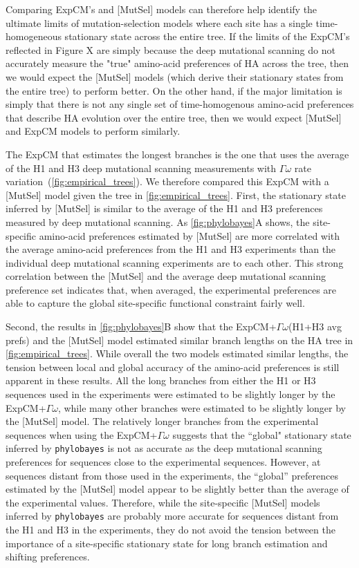 \documentclass[11pt]{article}
\newcommand\modelName[1]{{\color{magenta}[#1]}}
\begin{document}
Comparing ExpCM's and \modelName{MutSel} models can therefore help identify the ultimate limits of mutation-selection models where each site has a single time-homogeneous stationary state across the entire tree. 
If the limits of the ExpCM's reflected in Figure X are simply because the deep mutational scanning do not accurately measure the "true" amino-acid preferences of HA across the tree, then we would expect the \modelName{MutSel} models (which derive their stationary states from the entire tree) to perform better.
On the other hand, if the major limitation is simply that there is not any single set of time-homogenous amino-acid preferences that describe HA evolution over the entire tree, then we would expect \modelName{MutSel} and ExpCM models to perform similarly.

The ExpCM that estimates the longest branches is the one that uses the average of the H1 and H3 deep mutational scanning measurements with $\Gamma\omega$ rate variation~(\ref{fig:empirical_trees}).  
We therefore compared this ExpCM with a \modelName{MutSel} model given the tree in \ref{fig:empirical_trees}. 
First, the stationary state inferred by \modelName{MutSel} is similar to the average of the H1 and H3 preferences measured by deep mutational scanning. 
As \ref{fig:phylobayes}A shows, the site-specific amino-acid preferences estimated by \modelName{MutSel} are more correlated with the average amino-acid preferences from the H1 and H3 experiments than the individual deep mutational scanning experiments are to each other. 
This strong correlation between the \modelName{MutSel} and the average deep mutational scanning preference set indicates that, when averaged, the experimental preferences are able to capture the global site-specific functional constraint fairly well. 

Second, the results in \ref{fig:phylobayes}B show that the ExpCM+$\Gamma\omega$(H1+H3 avg prefs) and the \modelName{MutSel} model estimated similar branch lengths on the HA tree in \ref{fig:empirical_trees}. 
While overall the two models estimated similar lengths, the tension between local and global accuracy of the amino-acid preferences is still apparent in these results. 
All the long branches from either the H1 or H3 sequences used in the experiments were estimated to be slightly longer by the ExpCM+$\Gamma\omega$, while many other branches were estimated to be slightly longer by the \modelName{MutSel} model. 
The relatively longer branches from the experimental sequences when using the ExpCM+$\Gamma\omega$ suggests that the ``global" stationary state inferred by \texttt{phylobayes} is not as accurate as the deep mutational scanning preferences for sequences close to the experimental sequences. 
However, at sequences distant from those used in the experiments, the ``global'' preferences estimated by the \modelName{MutSel} model appear to be slightly better than the average of the experimental values.
Therefore, while the site-specific \modelName{MutSel} models inferred by \texttt{phylobayes} are probably more accurate for sequences distant from the H1 and H3 in the experiments, they do not avoid the tension between the importance of a site-specific stationary state for long branch estimation and shifting preferences. 
\end{document}

